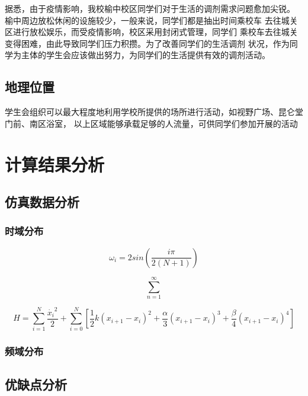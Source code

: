 \documentclass[AutoFakeBold]{LZUThesis}
\begin{document}
据悉，由于疫情影响，我校榆中校区同学们对于生活的调剂需求问题愈加尖锐。
榆中周边放松休闲的设施较少，一般来说，同学们都是抽出时间乘校车
去往城关区进行放松娱乐，而受疫情影响，校区采用封闭式管理，同学们
乘校车去往城关变得困难，由此导致同学们压力积攒。为了改善同学们的生活调剂
状况，作为同学为主体的学生会应该做出努力，为同学们的生活提供有效的调剂活动。

\section{地理位置}

学生会组织可以最大程度地利用学校所提供的场所进行活动，如视野广场、昆仑堂门前、南区浴室，
以上区域能够承载足够的人流量，可供同学们参加开展的活动
\chapter{计算结果分析}

\section{仿真数据分析}

\subsection{时域分布}

\begin{equation}
    \omega _i=2sin(\frac{i\pi}{2(N+1)})
\end{equation}

\begin{equation}
    \sum_{n = 1}^{\infty}  
\end{equation}

\begin{equation}
    H=\sum_{i = 1}^{N}  \frac{\dot{x_i}^2 }{2}+\sum_{i=0}^{N}[\frac{1}{2}k(x_{i+1}-x_i)^2+\frac{\alpha}{3}(x_{i+1}-x_i)^3+\frac{\beta}{4}(x_{i+1}-x_i)^4]
\end{equation}

\subsection{频域分布}

\section{优缺点分析}



\backmatter


\printbib
\nocite{*} %




\end{document}
